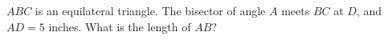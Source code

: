 $ABC$ is an equilateral triangle. The bisector of angle $A$ meets $BC$ at $D$, and $AD=5$ inches. What is the length of $AB$?
